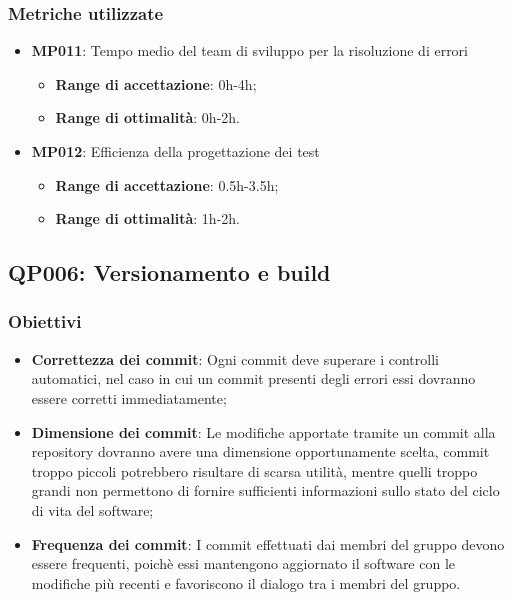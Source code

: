 \subsubsection{Metriche utilizzate}
\begin{itemize}
	\item \textbf{MP011}: Tempo medio del team di sviluppo per la risoluzione di errori
	\begin{itemize}
		\item \textbf{Range di accettazione}: 0h-4h;
		\item \textbf{Range di ottimalità}: 0h-2h.
	\end{itemize}
	\item \textbf{MP012}: Efficienza della progettazione dei test
	\begin{itemize}
		\item \textbf{Range di accettazione}: 0.5h-3.5h;
		\item \textbf{Range di ottimalità}: 1h-2h.
	\end{itemize}
\end{itemize}


\subsection{QP006: Versionamento e build}\label{pro6}
\subsubsection{Obiettivi}
\begin{itemize}
	\item \textbf{Correttezza dei commit}: Ogni commit deve superare i controlli automatici, nel caso in cui un commit presenti degli errori  essi dovranno essere corretti immediatamente;
	\item \textbf{Dimensione dei commit}: Le modifiche apportate tramite un commit alla repository dovranno avere una dimensione opportunamente scelta, commit troppo piccoli potrebbero risultare di scarsa utilità, mentre quelli troppo grandi non permettono di fornire sufficienti informazioni sullo stato del ciclo di vita del software;
	\item  \textbf{Frequenza dei commit}: I commit effettuati dai membri del gruppo devono essere frequenti, poichè essi mantengono aggiornato il software con le modifiche più recenti e favoriscono il dialogo tra i membri del gruppo.
	
\end{itemize}
